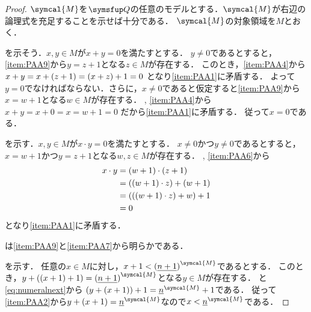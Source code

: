 \begin{proof}
	\(\symcal{M}\)を\(\Robinson\)の任意のモデルとする．\(\symcal{M}\)が右辺の論理式を充足することを示せば十分である．
	\(\symcal{M}\)の対象領域を\(M\)とおく．

	を示そう．\(x, y \in M\)が\(x + y = 0\)を満たすとする．
	\(y \neq 0\)であるとすると，\cref{item:PAA9}から\(y = z + 1\)となる\(z \in M\)が存在する．
	このとき，\cref{item:PAA4}から
	\(x + y = x + \paren{z + 1} = \paren{x + z} + 1 = 0\)
	となり\cref{item:PAA1}に矛盾する．
	よって\(y = 0\)でなければならない．さらに，\(x \neq 0\)であると仮定すると\cref{item:PAA9}から\(x = w + 1\)となる\(w \in M\)が存在する．
	, \cref{item:PAA4}から
	\(x + y = x + 0 = x = w + 1 = 0\)
	だから\cref{item:PAA1}に矛盾する．
	従って\(x = 0\)である．

	を示す．\(x, y \in M\)が\(x \cdot y = 0\)を満たすとする．
	\(x \neq 0\)かつ\(y \neq 0\)であるとすると，\(x = w + 1\)かつ\(y = z + 1\)となる\(w, z \in M\)が存在する．
	, \cref{item:PAA6}から
	\begin{align*}
		x \cdot y & = \paren{w + 1} \cdot \paren{z + 1}             \\
		          & = \paren{\paren{w + 1} \cdot z} + \paren{w + 1} \\
		          & = \paren{\paren{\paren{w + 1} \cdot z} + w} + 1 \\
		          & = 0
	\end{align*}
	となり\cref{item:PAA1}に矛盾する．

	は\cref{item:PAA9}と\cref{item:PAA7}から明らかである．

	を示す．
	任意の\(x \in M\)に対し，\(x + 1 < \interpretation{\symcal{M}}{\paren{\numeral{n + 1}}}\)であるとする．
	このとき，\(y + \paren{\paren{x + 1} + 1} = \interpretation{\symcal{M}}{\paren{\numeral{n + 1}}}\)となる\(y \in M\)が存在する．
	と\cref{eq:numeralnext}から
	\(\paren{y + \paren{x + 1}} + 1 = \interpretation{\symcal{M}}{\numeral{n}} + 1\)である．
	従って\cref{item:PAA2}から\(y + \paren{x + 1} = \interpretation{\symcal{M}}{\numeral{n}}\)なので\(x < \interpretation{\symcal{M}}{\numeral{n}}\)である．


\end{proof}
